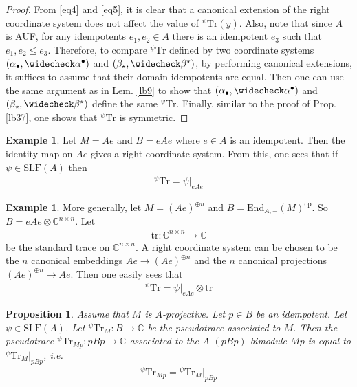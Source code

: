 \documentclass[11pt,b5paper,notitlepage]{article}
\theoremstyle{definition}
\newtheorem{eg}[df]{Example}
\theoremstyle{plain}
\newtheorem{pp}[df]{Proposition}
\newcommand{\wch}{\widecheck}
\newcommand{\Tr}{\mathrm{Tr}}
\newcommand{\End}{\mathrm{End}} %
\newcommand{\opp}{\mathrm{op}}
\newcommand{\blt}{\bullet}
\newcommand{\Cbb}{\mathbb C}
\newcommand{\SLF}{\mathrm{SLF}}
\newcommand{\trc}{\mathrm{tr}}
\numberwithin{equation}{section}
\begin{document}
\begin{proof}
From \eqref{eq4} and \eqref{eq5}, it is clear that a canonical extension of the right coordinate system does not affect the value of ${^\psi}\Tr(y)$. Also, note that since $A$ is AUF, for any idempotents $e_1,e_2\in A$ there is an idempotent $e_3$ such that $e_1,e_2\leq e_3$. Therefore, to compare ${^\psi}\Tr$ defined by two coordinate systems $(\alpha_\blt,\wch\alpha^\blt)$ and $(\beta_\star,\wch\beta^\star)$, by performing canonical extensions, it suffices to assume that their domain idempotents are equal. Then one can use the same argument as in Lem. \ref{lb9} to show that $(\alpha_\blt,\wch\alpha^\blt)$ and $(\beta_\star,\wch\beta^\star)$ define the same ${^\psi}\Tr$. Finally, similar to the proof of Prop. \ref{lb37}, one shows that ${^\psi}\Tr$ is symmetric.
\end{proof}



\begin{eg}
Let $M=Ae$ and $B=eAe$ where $e\in A$ is an idempotent. Then the identity map on $Ae$ gives a right coordinate system. From this, one sees that if $\psi\in\SLF(A)$ then
\begin{align*}
{^\psi}\Tr=\psi|_{eAe}
\end{align*}
\end{eg}


\begin{eg}\label{lb47}
More generally, let $M=(Ae)^{\oplus n}$ and $B=\End_{A,-}(M)^\opp$. So $B=eAe\otimes\Cbb^{n\times n}$. Let
\begin{align*}
\trc:\Cbb^{n\times n}\rightarrow\Cbb
\end{align*}
be the standard trace on $\Cbb^{n\times n}$. A right coordinate system can be chosen to be the $n$ canonical embeddings $Ae\rightarrow (Ae)^{\oplus n}$ and the $n$ canonical projections $(Ae)^{\oplus n}\rightarrow Ae$. Then one easily sees that
\begin{align*}
{^\psi}\Tr=\psi|_{eAe}\otimes\trc
\end{align*}
\end{eg}

\begin{pp}\label{lb40}
	Assume that $M$ is $A$-projective. Let $p\in B$ be an idempotent. Let $\psi\in\SLF(A)$. Let ${}^\psi\Tr_M:B\rightarrow\Cbb$ be the pseudotrace associated to $M$. Then the pseudotrace ${}^\psi\Tr_{Mp}:pBp\rightarrow\Cbb$ associated to the $A$-$(pBp)$ bimodule $Mp$ is equal to ${}^\psi\Tr_M\big|_{pBp}$, i.e.
\begin{align*}
{}^\psi\Tr_{Mp}={}^\psi\Tr_M\big|_{pBp}
\end{align*}
\end{pp}
\end{document}
